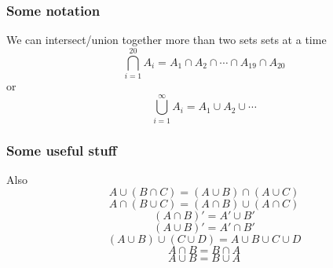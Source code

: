 \documentclass{beamer}
\begin{document}

\begin{frame}
\frametitle{Some notation}

We can intersect/union together more than two sets sets at a time
\[
\bigcap_{i=1}^{20} A_i = A_1 \cap A_2 \cap \cdots \cap A_{19} \cap A_{20}
\]
or
\[
\bigcup_{i=1}^{\infty} A_i = A_1 \cup A_2 \cup \cdots 
\]



\end{frame}



\begin{frame}
\frametitle{Some useful stuff}

Also
\[
A \cup (B \cap C) = (A \cup B) \cap (A \cup C)
\]
\[
A \cap (B \cup C) = (A \cap B) \cup (A \cap C)
\]
\[
(A \cap B)' = A' \cup B'
\]
\[
(A \cup B)' = A' \cap B'
\]
\[
(A \cup B) \cup (C \cup D) = A \cup B \cup C \cup D
\]
\[
A \cap B = B \cap A
\]
\[
A \cup B = B \cup A
\]

\end{frame}



\end{document}
